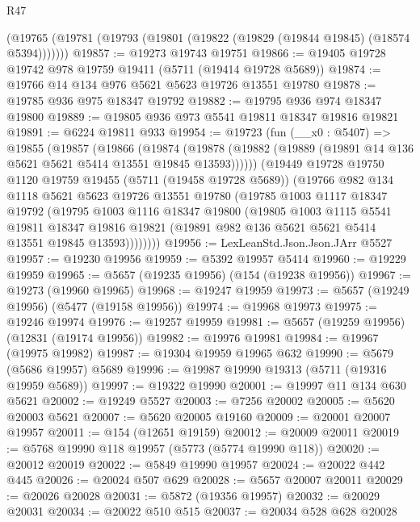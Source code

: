 \begin{lexlean}{R47}
\begin{coremodule}
    (@19765 (@19781 (@19793 (@19801 (@19822 (@19829 (@19844 @19845) (@18574 @5394)))))))
@19857 := @19273 @19743 @19751
@19866 := @19405 @19728 @19742 @978 @19759 @19411 (@5711 (@19414 @19728 @5689))
@19874 := @19766 @14 @134 @976 @5621 @5623 @19726 @13551 @19780
@19878 := @19785 @936 @975 @18347 @19792
@19882 := @19795 @936 @974 @18347 @19800
@19889 := @19805 @936 @973 @5541 @19811 @18347 @19816 @19821
@19891 := @6224 @19811 @933
@19954 := @19723
    (fun (__x0 : @5407) =>
    @19855
      (@19857
        (@19866
          (@19874
            (@19878 (@19882 (@19889 (@19891 @14 @136 @5621 @5621 @5414 @13551 @19845 @13593))))))
        (@19449
          @19728
          @19750
          @1120
          @19759
          @19455
          (@5711 (@19458 @19728 @5689))
          (@19766
            @982
            @134
            @1118
            @5621
            @5623
            @19726
            @13551
            @19780
            (@19785
              @1003
              @1117
              @18347
              @19792
              (@19795
                @1003
                @1116
                @18347
                @19800
                (@19805
                  @1003
                  @1115
                  @5541
                  @19811
                  @18347
                  @19816
                  @19821
                  (@19891 @982 @136 @5621 @5621 @5414 @13551 @19845 @13593))))))))
@19956 := LexLeanStd.Json.Json.JArr @5527
@19957 := @19230 @19956
@19959 := @5392 @19957 @5414
@19960 := @19229 @19959
@19965 := @5657 (@19235 @19956) (@154 (@19238 @19956))
@19967 := @19273 (@19960 @19965)
@19968 := @19247 @19959
@19973 := @5657 (@19249 @19956) (@5477 (@19158 @19956))
@19974 := @19968 @19973
@19975 := @19246 @19974
@19976 := @19257 @19959
@19981 := @5657 (@19259 @19956) (@12831 (@19174 @19956))
@19982 := @19976 @19981
@19984 := @19967 (@19975 @19982)
@19987 := @19304 @19959 @19965 @632
@19990 := @5679 (@5686 @19957) @5689
@19996 := @19987 @19990 @19313 (@5711 (@19316 @19959 @5689))
@19997 := @19322 @19990
@20001 := @19997 @11 @134 @630 @5621
@20002 := @19249 @5527
@20003 := @7256 @20002
@20005 := @5620 @20003 @5621
@20007 := @5620 @20005 @19160
@20009 := @20001 @20007 @19957
@20011 := @154 (@12651 @19159)
@20012 := @20009 @20011
@20019 := @5768 @19990 @118 @19957 (@5773 (@5774 @19990 @118))
@20020 := @20012 @20019
@20022 := @5849 @19990 @19957
@20024 := @20022 @442 @445
@20026 := @20024 @507 @629
@20028 := @5657 @20007 @20011
@20029 := @20026 @20028
@20031 := @5872 (@19356 @19957)
@20032 := @20029 @20031
@20034 := @20022 @510 @515
@20037 := @20034 @528 @628 @20028

\end{coremodule}
\end{lexlean}
